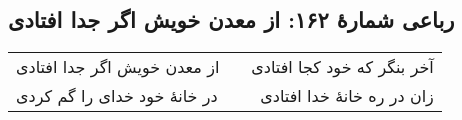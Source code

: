 \begin{center}
\section*{رباعی شمارهٔ ۱۶۲: از معدن خویش اگر جدا افتادی}
\label{sec:162}
\begin{longtable}{l p{0.5cm} r}
از معدن خویش اگر جدا افتادی
&&
آخر بنگر که خود کجا افتادی
\\
در خانهٔ خود خدای را گم کردی
&&
زان در ره خانهٔ خدا افتادی
\\
\end{longtable}
\end{center}
